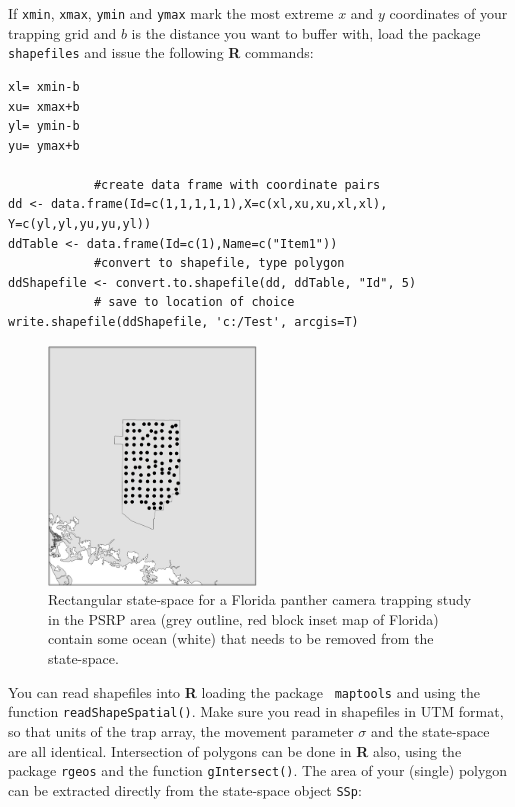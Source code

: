 If \mbox{\tt xmin}, \mbox{\tt xmax}, \mbox{\tt ymin} and 
\mbox{\tt ymax} mark the most extreme
$x$ and $y$ coordinates of your 
trapping grid and $b$ is the distance you want to buffer with, load the 
package \mbox{\tt shapefiles} \citep{stabler:2006} and issue the following
{\bf R} commands:
\begin{verbatim}
xl= xmin-b
xu= xmax+b
yl= ymin-b
yu= ymax+b

            #create data frame with coordinate pairs
dd <- data.frame(Id=c(1,1,1,1,1),X=c(xl,xu,xu,xl,xl), Y=c(yl,yl,yu,yu,yl)) 
ddTable <- data.frame(Id=c(1),Name=c("Item1"))
            #convert to shapefile, type polygon
ddShapefile <- convert.to.shapefile(dd, ddTable, "Id", 5) 
            # save to location of choice
write.shapefile(ddShapefile, 'c:/Test', arcgis=T) 
\end{verbatim}


\begin{figure}
\begin{center}
\includegraphics[height=2.5in]{Ch7/figs/panthercamera}
\end{center}
\caption{Rectangular state-space for a Florida panther camera trapping
study in the PSRP area (grey outline, red block inset map of Florida)
contain some ocean (white) that needs to be removed from the state-space.}
\label{mcmc.fig.pantercamera}
\end{figure}

You can read shapefiles into {\bf R} loading the package \mbox{\tt 
maptools}
\citep{lewin-koh_etal:2011} and using the function
\verb#readShapeSpatial()#. Make sure you read in shapefiles in UTM format, so
that units of the trap array, the movement parameter $\sigma$ and the
state-space are all identical.  Intersection of polygons can be done
in {\bf R} also, using the package \mbox{\tt rgeos} 
\citep{bivand_rundel:2011} and the
function \verb#gIntersect()#. The area of your (single) polygon can be
extracted directly from the state-space object \mbox{\tt SSp}:

